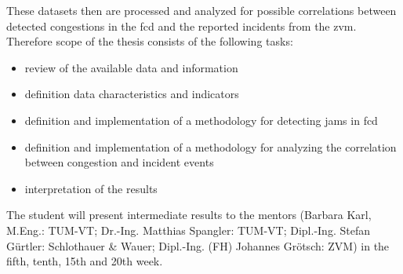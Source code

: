 \documentclass[a4paper,12pt]{report}
\begin{document}
These datasets then are processed and analyzed for possible correlations between detected congestions in the \acrshort{fcd} and the reported incidents from the \acrshort{zvm}. Therefore scope of the thesis consists of the following tasks:

\begin{itemize}
  \item review of the available data and information
  \item definition data characteristics and indicators
  \item definition and implementation of a methodology for detecting jams in \acrshort{fcd}
  \item definition and implementation of a methodology for analyzing the correlation between congestion and incident events
  \item interpretation of the results
\end{itemize}

The student will present intermediate results to the mentors 
		(Barbara Karl, M.Eng.: TUM-VT; 
		Dr.-Ing. Matthias Spangler: TUM-VT; 
		Dipl.-Ing. Stefan Gürtler: Schlothauer \& Wauer; 
		Dipl.-Ing. (FH) Johannes Grötsch: ZVM) 
	in the fifth, tenth, 15th and 20th week.
\end{document}
